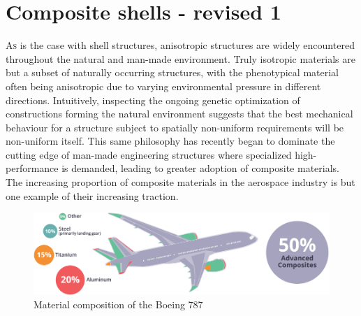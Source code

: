 



\chapter{Composite shells - revised 1}
\label{chap:chapter_2_1}

\renewcommand{\Thema}{Composite shells}

\lettrine[lines=2]{A}{s} is the case with shell structures, anisotropic structures are widely encountered throughout the natural and man-made environment. Truly isotropic materials are but a subset of naturally occurring structures, with the phenotypical material often being anisotropic due to varying environmental pressure in different directions. Intuitively, inspecting the ongoing genetic optimization of constructions forming the natural environment suggests that the best mechanical behaviour for a structure subject to spatially non-uniform requirements will be non-uniform itself. This same philosophy has recently began to dominate the cutting edge of man-made engineering structures where specialized high-performance is demanded, leading to greater adoption of composite materials. The increasing proportion of composite materials in the aerospace industry is but one example of their increasing traction.

\begin{figure}[H]
	\centering
	\def\svgwidth{\columnwidth}
	\includegraphics[width=14cm]{images/composites_aerospace.png}
	\caption{Material composition of the Boeing 787 \cite{AMCA2017}}
	\label{composite_aerospace}
\end{figure}

